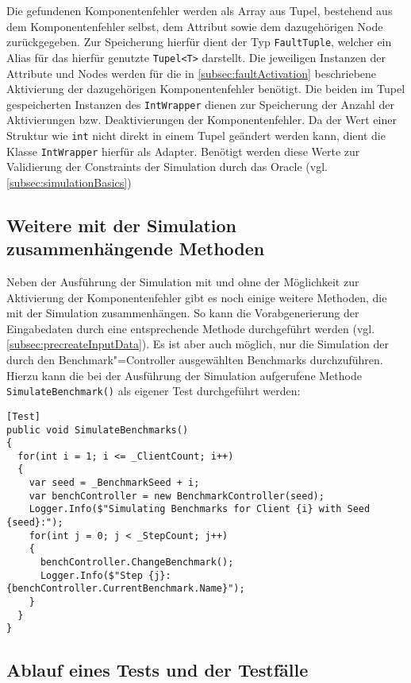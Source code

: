 Die gefundenen Komponentenfehler werden als Array aus Tupel, bestehend aus dem Komponentenfehler selbst, dem Attribut sowie dem dazugehörigen Node zurückgegeben.
Zur Speicherung hierfür dient der Typ \texttt{FaultTuple}, welcher ein Alias für das hierfür genutzte \texttt{Tupel<T>} darstellt.
Die jeweiligen Instanzen der Attribute und Nodes werden für die in \cref{subsec:faultActivation} beschriebene Aktivierung der dazugehörigen Komponentenfehler benötigt.
Die beiden im Tupel gespeicherten Instanzen des \texttt{IntWrapper} dienen zur Speicherung der Anzahl der Aktivierungen bzw. Deaktivierungen der Komponentenfehler.
Da der Wert einer Struktur wie \texttt{int} nicht direkt in einem Tupel geändert werden kann, dient die Klasse \texttt{IntWrapper} hierfür als Adapter.
Benötigt werden diese Werte zur Validierung der Constraints der Simulation durch das Oracle (vgl. \cref{subsec:simulationBasics})

\subsection{Weitere mit der Simulation zusammenhängende Methoden}
\label{subsec:simulationUtilities}

Neben der Ausführung der Simulation mit und ohne der Möglichkeit zur Aktivierung der Komponentenfehler gibt es noch einige weitere Methoden, die mit der Simulation zusammenhängen.
So kann \zB die Vorabgenerierung der Eingabedaten durch eine entsprechende Methode durchgeführt werden (vgl. \cref{subsec:precreateInputData}).
Es ist aber auch möglich, nur die Simulation der durch den Benchmark"=Controller ausgewählten Benchmarks durchzuführen.
Hierzu kann die bei der Ausführung der Simulation aufgerufene Methode \texttt{SimulateBenchmark()} als eigener \gls{Test} durchgeführt werden:

\begin{lstlisting}[label=lst:hadoopSimulationBenchmarks,style=cs,
caption={Simulation der auszuführenden Benchmarks}]
[Test]
public void SimulateBenchmarks()
{
  for(int i = 1; i <= _ClientCount; i++)
  {
    var seed = _BenchmarkSeed + i;
    var benchController = new BenchmarkController(seed);
    Logger.Info($"Simulating Benchmarks for Client {i} with Seed {seed}:");
    for(int j = 0; j < _StepCount; j++)
    {
      benchController.ChangeBenchmark();
      Logger.Info($"Step {j}: {benchController.CurrentBenchmark.Name}");
    }
  }
}
\end{lstlisting}

\subsection{Ablauf eines Tests und der Testfälle}
\label{subsec:simulationStep}

